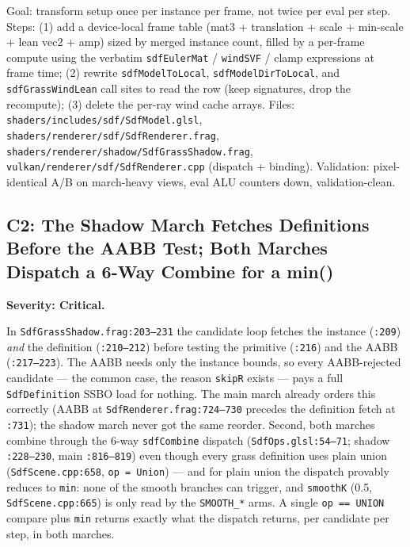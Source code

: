 \documentclass[11pt,a4paper]{article}
\begin{document}
\begin{tcolorbox}[promptbox={Prompt --- C1: per-instance SDF frame table}]
Goal: transform setup once per instance per frame, not twice per eval per
step. Steps: (1) add a device-local frame table (mat3 + translation +
scale + min-scale + lean vec2 + amp) sized by merged instance count,
filled by a per-frame compute using the verbatim \texttt{sdfEulerMat} /
\texttt{windSVF} / clamp expressions at frame time; (2) rewrite
\texttt{sdfModelToLocal}, \texttt{sdfModelDirToLocal}, and
\texttt{sdfGrassWindLean} call sites to read the row (keep signatures, drop
the recompute); (3) delete the per-ray wind cache arrays. Files:
\texttt{shaders/includes/sdf/SdfModel.glsl},
\texttt{shaders/renderer/sdf/SdfRenderer.frag},
\texttt{shaders/renderer/shadow/SdfGrassShadow.frag},
\texttt{vulkan/renderer/sdf/SdfRenderer.cpp} (dispatch + binding).
Validation: pixel-identical A/B on march-heavy views, eval ALU counters
down, validation-clean.
\end{tcolorbox}

\subsection{C2: The Shadow March Fetches Definitions Before the AABB Test; Both Marches Dispatch a 6-Way Combine for a min()}
\label{sec:c2}

\textbf{Severity: Critical.}

In \texttt{SdfGrassShadow.frag:203--231} the candidate loop fetches the
instance (\texttt{:209}) \emph{and} the definition (\texttt{:210--212})
before testing the primitive (\texttt{:216}) and the AABB
(\texttt{:217--223}). The AABB needs only the instance bounds, so every
AABB-rejected candidate --- the common case, the reason \texttt{skipR}
exists --- pays a full \texttt{SdfDefinition} SSBO load for nothing. The
main march already orders this correctly (AABB at
\texttt{SdfRenderer.frag:724--730} precedes the definition fetch at
\texttt{:731}); the shadow march never got the same reorder. Second, both
marches combine through the 6-way \texttt{sdfCombine} dispatch
(\texttt{SdfOps.glsl:54--71}; shadow \texttt{:228--230}, main
\texttt{:816--819}) even though every grass definition uses plain union
(\texttt{SdfScene.cpp:658}, \texttt{op = Union}) --- and for plain union
the dispatch provably reduces to \texttt{min}: none of the smooth branches
can trigger, and \texttt{smoothK} (0.5, \texttt{SdfScene.cpp:665}) is only
read by the \texttt{SMOOTH\_*} arms. A single \texttt{op == UNION} compare
plus \texttt{min} returns exactly what the dispatch returns, per candidate
per step, in both marches.
\end{document}

